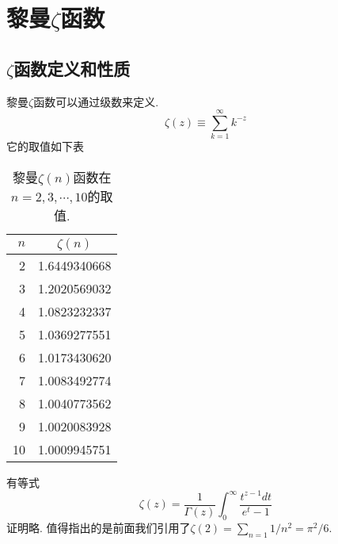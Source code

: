 \section{黎曼$\zeta$函数}

\subsection{$\zeta$函数定义和性质}
黎曼$\zeta$函数可以通过级数来定义.
\begin{equation}
    \zeta(z) \equiv \sum_{k=1}^{\infty} k^{-z}
\end{equation}
它的取值如下表
\begin{table}
    \centering
\begin{tabular}{rc}
    \hline$n$ & $\zeta(n)$ \\
    \hline 2 & 1.6449340668 \\
    3 & 1.2020569032 \\
    4 & 1.0823232337 \\
    5 & 1.0369277551 \\
    6 & 1.0173430620 \\
    7 & 1.0083492774 \\
    8 & 1.0040773562 \\
    9 & 1.0020083928 \\
    10 & 1.0009945751 \\
    \hline
\end{tabular}
\caption{黎曼$\zeta(n)$函数在$n=2,3,\cdots, 10$的取值.}
\end{table}

有等式
$$
\zeta(z)=\frac{1}{\Gamma(z)} \int_0^{\infty} \frac{t^{z-1} d t}{e^t-1}
$$
证明略.
值得指出的是前面我们引用了$\zeta(2) = \sum_{n=1} 1/n^2 = \pi^2/6$.
